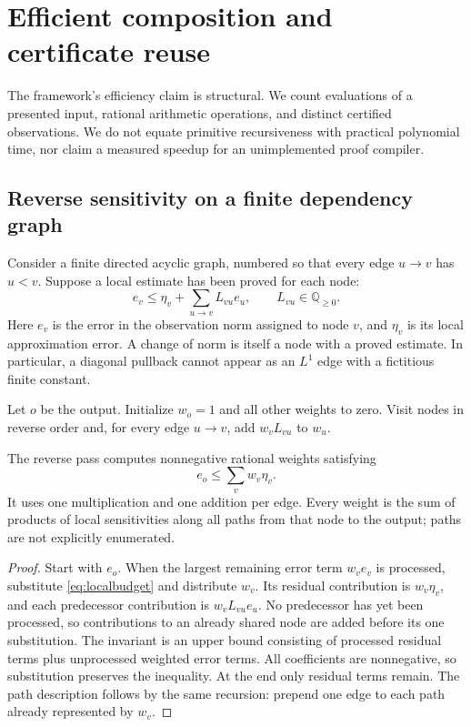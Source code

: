 \section{Efficient composition and certificate reuse}
\label{sec:efficiency}

The framework's efficiency claim is structural. We count evaluations
of a presented input, rational arithmetic operations, and distinct
certified observations. We do not equate primitive recursiveness with
practical polynomial time, nor claim a measured speedup for an
unimplemented proof compiler.

\subsection{Reverse sensitivity on a finite dependency graph}

Consider a finite directed acyclic graph, numbered so that every edge
\(u\to v\) has \(u<v\). Suppose a local estimate has been proved
for each node:
\[
 e_v\leq\eta_v+\sum_{u\to v}L_{vu}e_u,
 \qquad L_{vu}\in\mathbb Q_{\geq0}.
 \tag{L}\label{eq:localbudget}
\]
Here \(e_v\) is the error in the observation norm assigned to node
\(v\), and \(\eta_v\) is its local approximation error. A change of
norm is itself a node with a proved estimate. In particular, a
diagonal pullback cannot appear as an \(L^1\) edge with a fictitious
finite constant.

Let \(o\) be the output. Initialize \(w_o=1\) and all other weights
to zero. Visit nodes in reverse order and, for every edge \(u\to v\),
add \(w_vL_{vu}\) to \(w_u\).

\begin{theorem}\label{thm:dagbudget}
The reverse pass computes nonnegative rational weights satisfying
\[
 e_o\leq\sum_v w_v\eta_v.
 \tag{B}\label{eq:globalbudget}
\]
It uses one multiplication and one addition per edge. Every weight is
the sum of products of local sensitivities along all paths from that
node to the output; paths are not explicitly enumerated.
\end{theorem}
\begin{proof}
Start with \(e_o\). When the largest remaining error term \(w_ve_v\)
is processed, substitute \eqref{eq:localbudget} and distribute
\(w_v\). Its residual contribution is \(w_v\eta_v\), and each
predecessor contribution is \(w_vL_{vu}e_u\). No predecessor has yet
been processed, so contributions to an already shared node are added
before its one substitution. The invariant is an upper bound consisting
of processed residual terms plus unprocessed weighted error terms.
All coefficients are nonnegative, so substitution preserves the
inequality. At the end only residual terms remain. The path
description follows by the same recursion: prepend one edge to each
path already represented by \(w_v\).
\end{proof}

